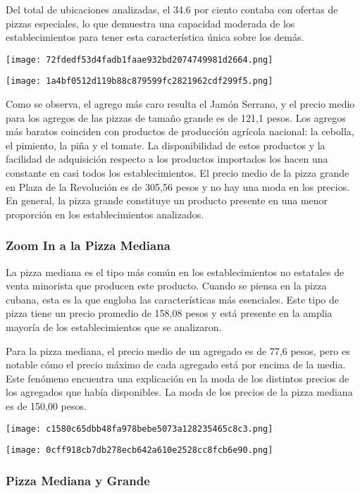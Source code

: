 Del total de ubicaciones analizadas, el 34.6 por ciento contaba con
ofertas de pizzas especiales, lo que demuestra una capacidad moderada de
los establecimientos para tener esta característica única sobre los
demás.


\texttt{[image: 72fdedf53d4fadb1faae932bd2074749981d2664.png]}


\texttt{[image: 1a4bf0512d119b88c879599fc2821962cdf299f5.png]}

Como se observa, el agrego más caro resulta el Jamón Serrano, y el
precio medio para los agregos de las pizzas de tamaño grande es de 121,1
pesos. Los agregos más baratos coinciden con productos de producción
agrícola nacional: la cebolla, el pimiento, la piña y el tomate. La
disponibilidad de estos productos y la facilidad de adquisición respecto
a los productos importados los hacen una constante en casi todos los
establecimientos. El precio medio de la pizza grande en Plaza de la
Revolución es de 305,56 pesos y no hay una moda en los precios. En
general, la pizza grande constituye un producto presente en una menor
proporción en los establecimientos analizados.

\hypertarget{zoom-in-a-la-pizza-mediana}{%
\subsubsection{Zoom In a la Pizza
Mediana}\label{zoom-in-a-la-pizza-mediana}}

La pizza mediana es el tipo más común en los establecimientos no
estatales de venta minorista que producen este producto. Cuando se
piensa en la pizza cubana, esta es la que engloba las características
más esenciales. Este tipo de pizza tiene un precio promedio de 158,08
pesos y está presente en la amplia mayoría de los establecimientos que
se analizaron.

Para la pizza mediana, el precio medio de un agregado es de 77,6 pesos,
pero es notable cómo el precio máximo de cada agregado está por encima
de la media. Este fenómeno encuentra una explicación en la moda de los
distintos precios de los agregados que había disponibles. La moda de los
precios de la pizza mediana es de 150,00 pesos.


\texttt{[image: c1580c65dbb48fa978bebe5073a128235465c8c3.png]}

\texttt{[image: 0cff918cb7db278ecb642a610e2528cc8fcb6e90.png]}

\hypertarget{pizza-mediana-y-grande}{%
\subsubsection{Pizza Mediana y Grande}\label{pizza-mediana-y-grande}}

